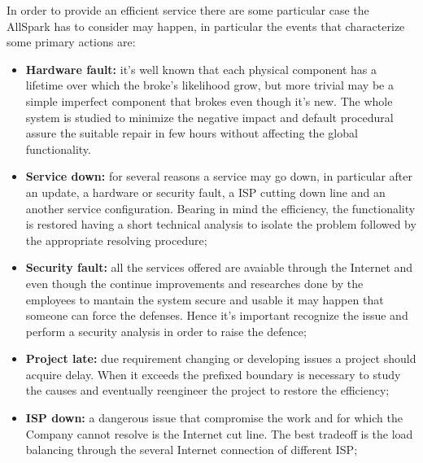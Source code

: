 In order to provide an efficient service there are some particular case the AllSpark has to consider may happen, in particular the events that characterize some primary actions are:
\begin{itemize}
  \item {\bf Hardware fault:} it's well known that each physical component has a lifetime over which the broke's likelihood grow, but more trivial may be a simple imperfect component that brokes even though it's new. The whole system is studied to minimize the negative impact and default procedural assure the suitable repair in few hours without affecting the global functionality.
  \item {\bf Service down:} for several reasons a service may go down, in particular after an update, a hardware or security fault, a ISP cutting down line and an another service configuration. Bearing in mind the efficiency, the functionality is restored having a short technical analysis to isolate the problem followed by the appropriate resolving procedure;
  \item {\bf Security fault:} all the services offered are avaiable through the Internet and even though the continue improvements and researches done by the employees to mantain the system secure and usable it may happen that someone can force the defenses. Hence it's important recognize the issue and perform a security analysis in order to raise the defence;
  \item {\bf Project late:} due requirement changing or developing issues a project should acquire delay. When it exceeds the prefixed boundary is necessary to study the causes and eventually reengineer the project to restore the efficiency;
  \item {\bf ISP down:} a dangerous issue that compromise the work and for which the Company cannot resolve is the Internet cut line. The best tradeoff is the load balancing through the several Internet connection of different ISP;
\end{itemize}

